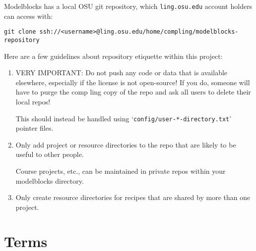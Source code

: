 \documentclass[12pt]{report}
\def\blue{\color{blue}}
\def\red{\color{red}}
\begin{document}
Modelblocks has a local OSU git repository, which {\blue\tt ling.osu.edu} account holders can access with:\!\!\!\!\!\!\!
%
{\blue\begin{verbatim}
git clone ssh://<username>@ling.osu.edu/home/compling/modelblocks-repository
\end{verbatim}
}

Here are a few guidelines about repository etiquette within this project:
%
\begin{enumerate}

\item {\red VERY IMPORTANT: Do not push any code or data that is available elsewhere, especially if the license is not open-source!
      If you do, someone will have to purge the comp ling copy of the repo and ask all users to delete their local repos!}

      This should instead be handled using `{\blue\tt config/user-*-directory.txt}' pointer files.

\item Only add project or resource directories to the repo that are likely to be useful to other people.

      Course projects, etc., can be maintained in private repos within your modelblocks directory.

\item Only create resource directories for recipes that are shared by more than one project.

\end{enumerate}




\chapter{Terms}
\end{document}
